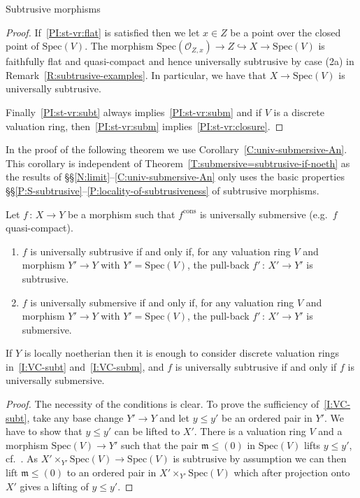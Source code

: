 \documentclass[a4paper,twoside,11pt]{amsart}[2009/07/02] %
\newcommand{\pref}[1]{\eqref{#1}}
\newcommand{\inj}{\hookrightarrow}
\newcommand{\map}[3]{#1\,:\, #2\rightarrow #3}
\newcommand{\Spec}{\mathrm{Spec}}
\newcommand{\cons}{\mathrm{cons}} %
\newcommand\im{\mathfrak{m}} %
\newcommand\sO{\mathcal{O}} %
\begin{document}
\begin{section}{Subtrusive morphisms}
\begin{proof}
If~\ref{PI:st-vr:flat} is satisfied then we let $x\in Z$ be a point over the
closed point of $\Spec(V)$. The morphism $\Spec(\sO_{Z,x})\to Z\inj X\to
\Spec(V)$ is faithfully flat and quasi-compact and hence universally subtrusive
by case (2a) in Remark~\pref{R:subtrusive-examples}. In particular, we have
that $X\to\Spec(V)$ is universally subtrusive.

Finally~\ref{PI:st-vr:subt} always implies~\ref{PI:st-vr:subm} and if $V$ is a
discrete valuation ring, then~\ref{PI:st-vr:subm}
implies~\ref{PI:st-vr:closure}.
\end{proof}

In the proof of the following theorem we use
Corollary~\pref{C:univ-submersive-An}. This corollary is independent
of Theorem~\pref{T:submersive=subtrusive-if-noeth} as the results of
\S\S\ref{N:limit}--\ref{C:univ-submersive-An} only uses the basic properties
\S\S\ref{P:S-subtrusive}--\ref{P:locality-of-subtrusiveness} of subtrusive
morphisms.

\begin{theorem}
\label{T:valuative_criterion_for_subtrusions}
\label{T:submersive=subtrusive-if-noeth}
Let $\map{f}{X}{Y}$ be a morphism such that $f^{\cons}$ is universally
submersive (e.g.\ $f$ quasi-compact).
%
\begin{enumerate}
\item $f$ is universally subtrusive if and only if, for any valuation ring $V$
and morphism $Y'\to Y$ with $Y'=\Spec(V)$, the pull-back $\map{f'}{X'}{Y'}$ is
subtrusive.\label{I:VC-subt}
\item $f$ is universally submersive if and only if, for any valuation ring $V$
and morphism $Y'\to Y$ with $Y'=\Spec(V)$, the pull-back $\map{f'}{X'}{Y'}$ is
submersive.\label{I:VC-subm}
\end{enumerate}
%
If $Y$ is locally noetherian then it is enough to consider discrete valuation
rings in~\ref{I:VC-subt} and~\ref{I:VC-subm}, and $f$ is universally subtrusive
if and only if $f$ is universally submersive.
\end{theorem}
\begin{proof}
The necessity of the conditions is clear. To prove the sufficiency
of~\ref{I:VC-subt}, take any base change $Y'\to Y$ and let $y\leq y'$ be an
ordered pair in $Y'$. We have to show that $y\leq y'$ can be lifted to
$X'$. There is a valuation ring $V$ and a morphism $\Spec(V)\to Y'$ such that
the pair $\im\leq (0)$ in $\Spec(V)$ lifts $y\leq y'$, cf.~\cite[Ch.~VI, \S1,
No.~2, Cor.]{bourbaki_alg_comm_5_6}.
As $X'\times_{Y'} \Spec(V)\to \Spec(V)$ is subtrusive by assumption we can then
lift $\im\leq (0)$ to an ordered pair in $X'\times_{Y'} \Spec(V)$ which after
projection onto $X'$ gives a lifting of $y\leq y'$.


\end{proof}
\end{section}
\end{document}
